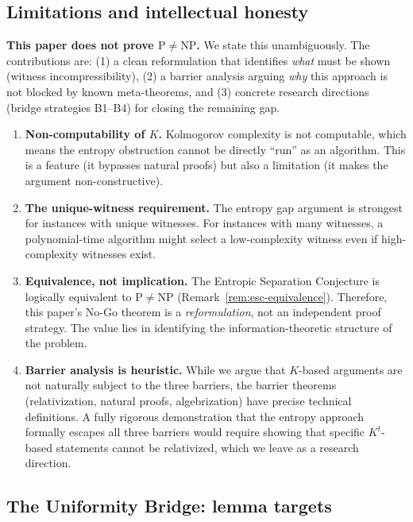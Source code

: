 \documentclass[aps,prd,twocolumn,superscriptaddress,nofootinbib]{revtex4-2}
\theoremstyle{definition}
\theoremstyle{remark}
\newcommand{\NP}{\mathrm{NP}}
\newcommand{\PP}{\mathrm{P}}
\begin{document}
\subsection{Limitations and intellectual honesty}

\textbf{This paper does not prove $\PP \neq \NP$.} We state this unambiguously. The contributions are: (1) a clean reformulation that identifies \textit{what} must be shown (witness incompressibility), (2) a barrier analysis arguing \textit{why} this approach is not blocked by known meta-theorems, and (3) concrete research directions (bridge strategies B1--B4) for closing the remaining gap.

\begin{enumerate}
\item \textbf{Non-computability of $K$.} Kolmogorov complexity is not computable, which means the entropy obstruction cannot be directly ``run'' as an algorithm. This is a feature (it bypasses natural proofs) but also a limitation (it makes the argument non-constructive).

\item \textbf{The unique-witness requirement.} The entropy gap argument is strongest for instances with unique witnesses. For instances with many witnesses, a polynomial-time algorithm might select a low-complexity witness even if high-complexity witnesses exist.

\item \textbf{Equivalence, not implication.} The Entropic Separation Conjecture is logically equivalent to $\PP \neq \NP$ (Remark~\ref{rem:esc-equivalence}). Therefore, this paper's No-Go theorem is a \textit{reformulation}, not an independent proof strategy. The value lies in identifying the information-theoretic structure of the problem.

\item \textbf{Barrier analysis is heuristic.} While we argue that $K$-based arguments are not naturally subject to the three barriers, the barrier theorems (relativization, natural proofs, algebrization) have precise technical definitions. A fully rigorous demonstration that the entropy approach formally escapes all three barriers would require showing that specific $K^t$-based statements cannot be relativized, which we leave as a research direction.
\end{enumerate}

\subsection{The Uniformity Bridge: lemma targets}
\label{sec:uniformity-bridge}
\end{document}
